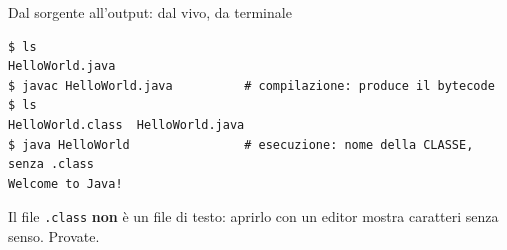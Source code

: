 \documentclass[10pt,aspectratio=169]{beamer}
\begin{document}
\begin{frame}[fragile]{Dal sorgente all'output: dal vivo, da terminale}
\begin{lstlisting}[style=shell]
$ ls
HelloWorld.java
$ javac HelloWorld.java          # compilazione: produce il bytecode
$ ls
HelloWorld.class  HelloWorld.java
$ java HelloWorld                # esecuzione: nome della CLASSE, senza .class
Welcome to Java!
\end{lstlisting}


\small Il file \texttt{.class} \textbf{non} è un file di testo: aprirlo con un editor mostra caratteri senza senso. Provate.
\end{frame}
\end{document}
